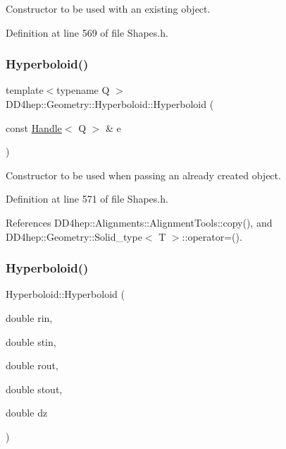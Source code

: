 Constructor to be used with an existing object. 



Definition at line 569 of file Shapes.\+h.

\hypertarget{class_d_d4hep_1_1_geometry_1_1_hyperboloid_a40b3d911584cba7a8ff1029e53eaa222}{}\label{class_d_d4hep_1_1_geometry_1_1_hyperboloid_a40b3d911584cba7a8ff1029e53eaa222} 
\subsubsection{\texorpdfstring{Hyperboloid()}{Hyperboloid()}\hspace{0.1cm}{\footnotesize\ttfamily [4/5]}}
{\footnotesize\ttfamily template$<$typename Q $>$ \\
D\+D4hep\+::\+Geometry\+::\+Hyperboloid\+::\+Hyperboloid (\begin{DoxyParamCaption}\item[{const \hyperlink{class_d_d4hep_1_1_handle}{Handle}$<$ Q $>$ \&}]{e }\end{DoxyParamCaption})\hspace{0.3cm}{\ttfamily [inline]}}



Constructor to be used when passing an already created object. 



Definition at line 571 of file Shapes.\+h.



References D\+D4hep\+::\+Alignments\+::\+Alignment\+Tools\+::copy(), and D\+D4hep\+::\+Geometry\+::\+Solid\+\_\+type$<$ T $>$\+::operator=().

\hypertarget{class_d_d4hep_1_1_geometry_1_1_hyperboloid_a1ba636fc512e1c1c1c183a8ab24db52f}{}\label{class_d_d4hep_1_1_geometry_1_1_hyperboloid_a1ba636fc512e1c1c1c183a8ab24db52f} 
\subsubsection{\texorpdfstring{Hyperboloid()}{Hyperboloid()}\hspace{0.1cm}{\footnotesize\ttfamily [5/5]}}
{\footnotesize\ttfamily Hyperboloid\+::\+Hyperboloid (\begin{DoxyParamCaption}\item[{double}]{rin,  }\item[{double}]{stin,  }\item[{double}]{rout,  }\item[{double}]{stout,  }\item[{double}]{dz }\end{DoxyParamCaption})}



